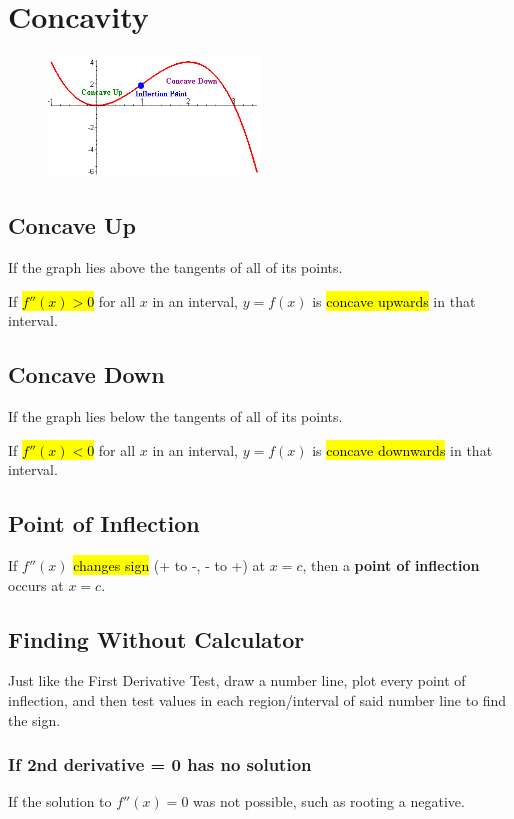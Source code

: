 \documentclass[a4paper,12pt]{article}
\begin{document}
\pagebreak

\section{Concavity}
\begin{figure}[H]
    \centering
    \includegraphics[width=0.50\textwidth]{concave}
\end{figure}

\subsection{Concave Up}
If the graph lies above the tangents of all of its points.

If \hl{$f''(x) > 0$} for all $x$ in an interval, $y = f(x)$ is \hl{concave upwards} in that interval.

\subsection{Concave Down}
If the graph lies below the tangents of all of its points.

If \hl{$f''(x) < 0$} for all $x$ in an interval, $y = f(x)$ is \hl{concave downwards} in that interval.

\subsection{Point of Inflection}
If $f''(x)$ \hl{changes sign} (+ to -, - to +) at $x = c$, then a \textbf{point of inflection} occurs at $x = c$.

\subsection{Finding Without Calculator}
Just like the First Derivative Test, draw a number line, plot every point of inflection, and then test values in each region/interval of said number line to find the sign.

\subsubsection{If 2nd derivative = 0 has no solution}
If the solution to $f''(x) = 0$ was not possible, such as rooting a negative.
\end{document}
